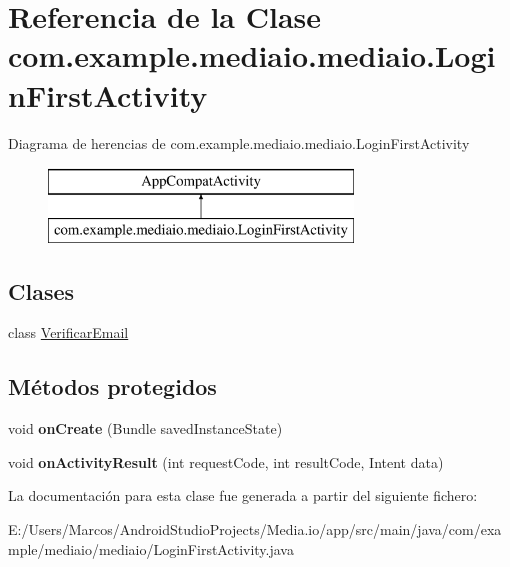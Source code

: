 \hypertarget{classcom_1_1example_1_1mediaio_1_1mediaio_1_1_login_first_activity}{}\section{Referencia de la Clase com.\+example.\+mediaio.\+mediaio.\+Login\+First\+Activity}
\label{classcom_1_1example_1_1mediaio_1_1mediaio_1_1_login_first_activity}
Diagrama de herencias de com.\+example.\+mediaio.\+mediaio.\+Login\+First\+Activity\begin{figure}[H]
\begin{center}
\leavevmode
\includegraphics[height=2.000000cm]{classcom_1_1example_1_1mediaio_1_1mediaio_1_1_login_first_activity}
\end{center}
\end{figure}
\subsection*{Clases}
\begin{DoxyCompactItemize}
\item 
class \hyperlink{classcom_1_1example_1_1mediaio_1_1mediaio_1_1_login_first_activity_1_1_verificar_email}{Verificar\+Email}
\end{DoxyCompactItemize}
\subsection*{Métodos protegidos}
\begin{DoxyCompactItemize}
\item 
\mbox{\label{classcom_1_1example_1_1mediaio_1_1mediaio_1_1_login_first_activity_a460f89d7dacaeb22ff9487c29d6362d7}} 
void {\bfseries on\+Create} (Bundle saved\+Instance\+State)
\item 
\mbox{\label{classcom_1_1example_1_1mediaio_1_1mediaio_1_1_login_first_activity_a9c3759d6bc6d41c5dfaba30eb2b89df0}} 
void {\bfseries on\+Activity\+Result} (int request\+Code, int result\+Code, Intent data)
\end{DoxyCompactItemize}


La documentación para esta clase fue generada a partir del siguiente fichero\+:\begin{DoxyCompactItemize}
\item 
E\+:/\+Users/\+Marcos/\+Android\+Studio\+Projects/\+Media.\+io/app/src/main/java/com/example/mediaio/mediaio/Login\+First\+Activity.\+java\end{DoxyCompactItemize}
